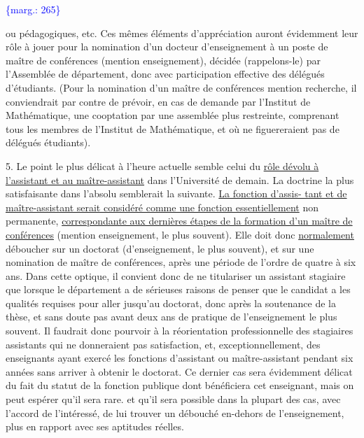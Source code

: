 \documentclass[11pt]{article}
\newcommand{\scanpage}[1]{\par\bigskip\noindent{\small\sffamily[scan #1]}\par}
\newcommand{\mspage}[1]{{\small\sffamily[p.\,#1]}}
\newcommand{\margin}[1]{\textcolor{blue}{\{\textsf{marg.:} #1\}}}
\newcommand{\uline}[1]{\underline{#1}}
\begin{document}
\margin{265}

\clearpage
\scanpage{119/266}
\mspage{13}

ou pédagogiques, etc. Ces mêmes éléments d'appréciation auront évidemment leur
rôle à jouer pour la nomination d'un docteur d'enseignement à un poste de
maître de conférences (mention enseignement), décidée (rappelons-le) par
l'Assemblée de département, donc avec participation effective des délégués
d'étudiants. (Pour la nomination d'un maître de conférences mention recherche,
il conviendrait par contre de prévoir, en cas de demande par l'Institut de
Mathématique, une cooptation par une assemblée plus restreinte, comprenant
tous les membres de l'Institut de Mathématique, et où ne figuereraient pas de
délégués étudiants).

5. Le point le plus délicat à l'heure actuelle semble celui du \uline{rôle dévolu à
l'assistant et au maître-assistant} dans l'Université de demain. La doctrine
la plus satisfaisante dans l'absolu semblerait la suivante. \uline{La fonction d'assis-%
tant et de maître-assistant serait considéré comme une fonction essentiellement}
non permanente, \uline{correspondante aux dernières étapes de la formation d'un
maître de conférences} (mention enseignement, le plus souvent). Elle doit donc
\uline{normalement} déboucher sur un doctorat (d'enseignement, le plus souvent), et
sur une nomination de maître de conférences, après une période de l'ordre de
quatre à six ans. Dans cette optique, il convient donc de ne titulariser un
assistant stagiaire que lorsque le département a de sérieuses raisons de penser
que le candidat a les qualités requises pour aller jusqu'au doctorat, donc
après la soutenance de la thèse, et sans doute pas avant deux ans de pratique
de l'enseignement le plus souvent. Il faudrait donc pourvoir à la réorientation
professionnelle des stagiaires assistants qui ne donneraient pas satisfaction,
et, exceptionnellement, des enseignants ayant exercé les fonctions d'assistant
ou maître-assistant pendant six années sans arriver à obtenir le doctorat. Ce
dernier cas sera évidemment délicat du fait du statut de la fonction publique
dont bénéficiera cet enseignant, mais on peut espérer qu'il sera rare. et
qu'il sera possible dans la plupart des cas, avec l'accord de l'intéressé, de
lui trouver un débouché en-dehors de l'enseignement, plus en rapport avec ses
aptitudes réelles.
\end{document}
